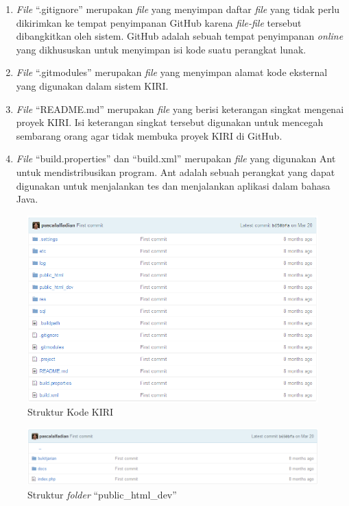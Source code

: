 \documentclass[a4paper,twoside]{article}
\begin{document}
\begin{enumerate}
\begin{enumerate}
	\item \textit{File} ``.gitignore'' merupakan \textit{file} yang menyimpan daftar \textit{file} yang tidak perlu dikirimkan ke tempat penyimpanan GitHub karena \textit{file-file} tersebut dibangkitkan oleh sistem. GitHub adalah sebuah tempat penyimpanan \textit{online} yang dikhususkan untuk menyimpan isi kode suatu perangkat lunak\cite{github}.
	\item \textit{File} ``.gitmodules'' merupakan \textit{file} yang menyimpan alamat kode eksternal yang digunakan dalam sistem KIRI.
	\item \textit{File} ``README.md'' merupakan \textit{file} yang berisi keterangan singkat mengenai proyek KIRI. Isi keterangan singkat tersebut digunakan untuk mencegah sembarang orang agar tidak membuka proyek KIRI di GitHub.
	\item \textit{File} ``build.properties'' dan ``build.xml'' merupakan \textit{file} yang digunakan Ant untuk mendistribusikan program. Ant adalah sebuah perangkat yang dapat digunakan untuk menjalankan tes dan menjalankan aplikasi dalam bahasa Java\cite{ant}.
\end{enumerate}

\begin{figure}[htbp]
	\centering
		\includegraphics[scale=0.5]{Gambar/3_strukturkiri.png}
	\caption{Struktur Kode KIRI}
	\label{fig:3_strukturkiri}
\end{figure}

\begin{figure}[htbp]
	\centering
		\includegraphics[scale=0.5]{Gambar/3_public_html_dev.png}
	\caption{Struktur \textit{folder} ``public\_html\_dev''}
	\label{fig:3_public_html_dev}
\end{figure}


\end{enumerate}
\end{document}
